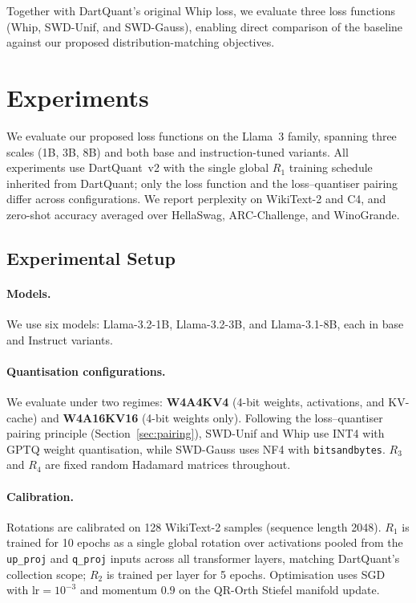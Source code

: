 \documentclass[11pt,a4paper]{article}
\begin{document}
Together with DartQuant's original Whip loss, we evaluate three loss functions (Whip, SWD-Unif, and SWD-Gauss), enabling direct comparison of the baseline against our proposed distribution-matching objectives.

\section{Experiments}
\label{sec:experiments}
 
We evaluate our proposed loss functions on the Llama~3 family, spanning three scales (1B, 3B, 8B) and both base and instruction-tuned variants. All experiments use DartQuant~v2 with the single global $R_1$ training schedule inherited from DartQuant; only the loss function and the loss--quantiser pairing differ across configurations. We report perplexity on WikiText-2 and C4, and zero-shot accuracy averaged over HellaSwag, ARC-Challenge, and WinoGrande.

\subsection{Experimental Setup}
\label{sec:setup}

\paragraph{Models.} We use six models: Llama-3.2-1B, Llama-3.2-3B, and Llama-3.1-8B, each in base and Instruct variants.

\paragraph{Quantisation configurations.} We evaluate under two regimes: \textbf{W4A4KV4} (4-bit weights, activations, and KV-cache) and \textbf{W4A16KV16} (4-bit weights only). Following the loss--quantiser pairing principle (Section~\ref{sec:pairing}), SWD-Unif and Whip use INT4 with GPTQ weight quantisation, while SWD-Gauss uses NF4 with \texttt{bitsandbytes}. $R_3$ and $R_4$ are fixed random Hadamard matrices throughout.

\paragraph{Calibration.} Rotations are calibrated on 128 WikiText-2 samples (sequence length 2048). $R_1$ is trained for 10 epochs as a single global rotation over activations pooled from the \texttt{up\_proj} and \texttt{q\_proj} inputs across all transformer layers, matching DartQuant's collection scope; $R_2$ is trained per layer for 5 epochs. Optimisation uses SGD with $\text{lr}=10^{-3}$ and momentum $0.9$ on the QR-Orth Stiefel manifold update.
\end{document}
